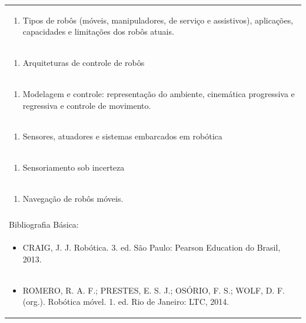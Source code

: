\documentclass[11pt]{article}
\begin{document}
\begin{center}
\begin{longtable}{|p{4cm}|p{4cm}|p{4cm}|p{4cm}|}
\multicolumn{4}{|p{\dimexpr 16cm + 6\tabcolsep\relax}|}{\begin{enumerate}[start=2]\item Tipos de robôs (móveis, manipuladores, de serviço e assistivos), aplicações, capacidades e limitações dos robôs atuais.\end{enumerate}}\\
\multicolumn{4}{|p{\dimexpr 16cm + 6\tabcolsep\relax}|}{\begin{enumerate}[start=3]\item Arquiteturas de controle de robôs\end{enumerate}}\\
\multicolumn{4}{|p{\dimexpr 16cm + 6\tabcolsep\relax}|}{\begin{enumerate}[start=4]\item Modelagem e controle: representação do ambiente, cinemática progressiva e regressiva e controle de movimento.\end{enumerate}}\\
\multicolumn{4}{|p{\dimexpr 16cm + 6\tabcolsep\relax}|}{\begin{enumerate}[start=5]\item Sensores, atuadores e sistemas embarcados em robótica\end{enumerate}}\\
\multicolumn{4}{|p{\dimexpr 16cm + 6\tabcolsep\relax}|}{\begin{enumerate}[start=6]\item Sensoriamento sob incerteza\end{enumerate}}\\
\multicolumn{4}{|p{\dimexpr 16cm + 6\tabcolsep\relax}|}{\begin{enumerate}[start=7]\item Navegação de robôs móveis.\end{enumerate}}\\
\multicolumn{4}{|p{\dimexpr 16cm + 6\tabcolsep\relax}|}{}\\
\hline
\multicolumn{4}{|p{16cm}|}{Bibliografia Básica:}\\*
\multicolumn{4}{|p{\dimexpr 16cm + 6\tabcolsep\relax}|}{\begin{itemize}\item CRAIG, J. J. Robótica. 3. ed. São Paulo: Pearson Education do Brasil, 2013.\end{itemize}}\\
\multicolumn{4}{|p{\dimexpr 16cm + 6\tabcolsep\relax}|}{\begin{itemize}\item ROMERO, R. A. F.; PRESTES, E. S. J.; OSÓRIO, F. S.; WOLF, D. F. (org.). Robótica móvel. 1. ed. Rio de Janeiro: LTC, 2014.\end{itemize}}\\

\end{longtable}
\end{center}
\end{document}
